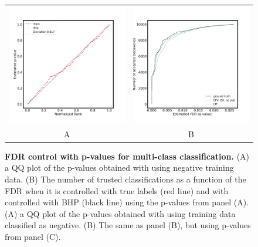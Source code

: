 \documentclass{article}
\begin{document}
\begin{figure}
    \centering
	\begin{tabular}{cc}
		\includegraphics[width=3in]{img/cnn_QQ_multi.pdf} &
		\includegraphics[width=3in]{img/cnn_multi_fdr_control.pdf} \\	
		A & B \\
	\end{tabular}
	\caption{{\bf FDR control with p-values for multi-class classification.}
		(A) a QQ plot of the p-values obtained with using negative training data. (B) The number of trusted classifications as a function of the FDR when it is controlled with true labels (red line) and with controlled with BHP (black line) using the p-values from panel (A).
		(A) a QQ plot of the p-values obtained with using training data classified as negative. (B) The same as panel (B), but using p-values from panel (C).
	}
	\label{fig:multi}
\end{figure}
\end{document}
